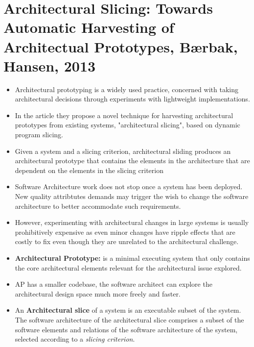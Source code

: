 \section{Architectural Slicing: Towards Automatic Harvesting of Architectual Prototypes, Bærbak, Hansen, 2013}

\begin{itemize}
  \item Architectural prototyping is a widely used practice, concerned with taking architectural decisions through experiments with lightweight implementations.
  \item In the article they propose a novel technique for harvesting architectural prototypes from existing systems, "architectural slicing", based on dynamic program slicing.
  \item Given a system and a slicing criterion, architectural sliding produces an architectural prototype that contains the elements in the architecture that are dependent on the elements in the slicing criterion
  \item Software Architecture work does not stop once a system has been deployed. New quality attribtutes demands may trigger the wish to change the software architecture to better accommodate such requirements.
  \item However, experimenting with architectural changes in large systems is usually prohibitively expensive as even minor changes have ripple effects that are costly to fix even though they are unrelated to the architectural challenge.
  \item \textbf{Architectural Prototype: } is a minimal executing system that only contains the core architectural elements relevant for the architectural issue explored.
  \item AP has a smaller codebase, the software architect can explore the architectural design space much more freely and faster.
  \item An \textbf{Architectural slice} of a system is an executable subset of the system. The software architecture of the architectural slice comprises a subset of the software elements and relations of the software architecture of the system, selected according to a \textit{slicing criterion}.
\end{itemize}

